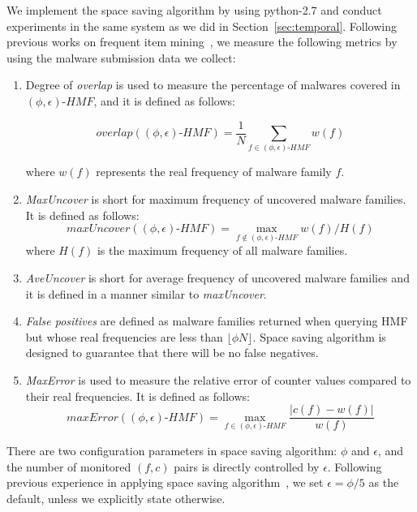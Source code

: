 We implement the space saving algorithm by using python-2.7
and conduct experiments in the same system as we did in Section~\ref{sec:temporal}.
Following previous works on frequent item mining~\cite{hot-calling-context}, 
we measure the following metrics by using the malware submission data we collect:

\begin{enumerate}

\item 
Degree of \textit{overlap} is used to measure the percentage of malwares covered in $(\phi, \epsilon)\mbox{-}HMF$,
and it is defined as follows:

\begingroup\makeatletter{}\check@mathfonts
$$overlap((\phi, \epsilon)\mbox{-}HMF) = \dfrac{1}{N}\sum_{f \in (\phi, \epsilon)\mbox{-}HMF}w(f)$$
\endgroup

where $w(f)$ represents the real frequency of malware family $f$.  

\item 
\textit{MaxUncover} is short for maximum frequency of uncovered malware families. 
It is defined as follows:
\begingroup\makeatletter\def\f@size{8}\check@mathfonts
$$maxUncover((\phi, \epsilon)\mbox{-}HMF) = \max_{f \notin (\phi, \epsilon)\mbox{-}HMF}w(f)/H(f)$$
\endgroup
where $H(f)$ is the maximum frequency of all malware families. 

\item 
\textit{AveUncover} is short for average frequency of uncovered malware families 
and it is defined in a manner similar to \textit{maxUncover}. 

\item 
\textit{False positives} are defined as malware families returned when querying HMF
but whose real frequencies are less than $\lfloor \phi N \rfloor$. 
Space saving algorithm is designed to guarantee that there will be no false negatives. 

\item 
\textit{MaxError} is used to measure the relative error of counter values
compared to their real frequencies.
It is defined as follows:
\begingroup\makeatletter\def\f@size{8}\check@mathfonts
$$maxError((\phi, \epsilon)\mbox{-}HMF) = \max_{f \in (\phi, \epsilon)\mbox{-}HMF} \dfrac{\left|c(f) - w(f)\right|}{w(f)}$$
\endgroup


\end{enumerate}

There are two configuration parameters in space saving algorithm: $\phi$ and $\epsilon$, 
and the number of monitored $(f, c)$ pairs is directly controlled by $\epsilon$. 
Following previous experience in applying space saving algorithm~\cite{hot-calling-context}, 
we set $\epsilon = \phi/5$ as the default, 
unless we explicitly state otherwise.  

